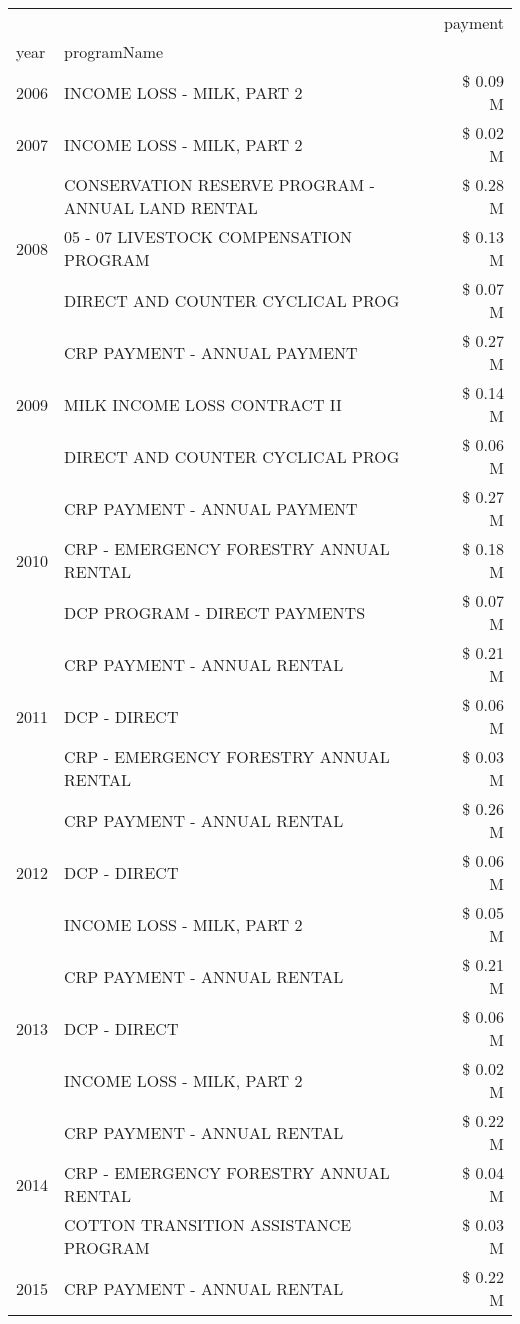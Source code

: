 \begin{tabular}{llr}
\toprule
 &  & payment \\
year & programName &  \\
\midrule
2006 & INCOME LOSS - MILK, PART 2 & \$ 0.09 M \\
\cline{1-3}
2007 & INCOME LOSS - MILK, PART 2 & \$ 0.02 M \\
\cline{1-3}
\multirow[t]{3}{*}{2008} & CONSERVATION RESERVE PROGRAM - ANNUAL LAND RENTAL & \$ 0.28 M \\
 & 05 - 07 LIVESTOCK COMPENSATION PROGRAM & \$ 0.13 M \\
 & DIRECT AND COUNTER CYCLICAL PROG & \$ 0.07 M \\
\cline{1-3}
\multirow[t]{3}{*}{2009} & CRP PAYMENT - ANNUAL PAYMENT & \$ 0.27 M \\
 & MILK INCOME LOSS CONTRACT II & \$ 0.14 M \\
 & DIRECT AND COUNTER CYCLICAL PROG & \$ 0.06 M \\
\cline{1-3}
\multirow[t]{3}{*}{2010} & CRP PAYMENT - ANNUAL PAYMENT & \$ 0.27 M \\
 & CRP - EMERGENCY FORESTRY ANNUAL RENTAL & \$ 0.18 M \\
 & DCP PROGRAM - DIRECT PAYMENTS & \$ 0.07 M \\
\cline{1-3}
\multirow[t]{3}{*}{2011} & CRP PAYMENT - ANNUAL RENTAL & \$ 0.21 M \\
 & DCP - DIRECT & \$ 0.06 M \\
 & CRP - EMERGENCY FORESTRY ANNUAL RENTAL & \$ 0.03 M \\
\cline{1-3}
\multirow[t]{3}{*}{2012} & CRP PAYMENT - ANNUAL RENTAL & \$ 0.26 M \\
 & DCP - DIRECT & \$ 0.06 M \\
 & INCOME LOSS - MILK, PART 2 & \$ 0.05 M \\
\cline{1-3}
\multirow[t]{3}{*}{2013} & CRP PAYMENT - ANNUAL RENTAL & \$ 0.21 M \\
 & DCP - DIRECT & \$ 0.06 M \\
 & INCOME LOSS - MILK, PART 2 & \$ 0.02 M \\
\cline{1-3}
\multirow[t]{3}{*}{2014} & CRP PAYMENT - ANNUAL RENTAL & \$ 0.22 M \\
 & CRP - EMERGENCY FORESTRY ANNUAL RENTAL & \$ 0.04 M \\
 & COTTON TRANSITION ASSISTANCE PROGRAM & \$ 0.03 M \\
\cline{1-3}
\multirow[t]{3}{*}{2015} & CRP PAYMENT - ANNUAL RENTAL & \$ 0.22 M \\

\end{tabular}
